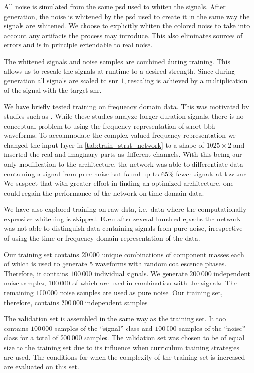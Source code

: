 All noise is simulated from the same \acrshort{psd} used to whiten the signals. After generation, the noise is whitened by the \acrshort{psd} used to create it in the same way the signals are whitened. We choose to explicitly whiten the colored noise to take into account any artifacts the process may introduce. This also eliminates sources of errors and is in principle extendable to real noise.

The whitened signals and noise samples are combined during training. This allows us to rescale the signals at runtime to a desired strength. Since during generation all signals are scaled to \acrshort{snr} $1$, rescaling is achieved by a multiplication of the signal with the target \acrshort{snr}.

We have briefly tested training on frequency domain data. This was motivated by studies such as \cite{Dreissigacker:2019edy, Wei:2020sfz}. While these studies analyze longer duration signals, there is no conceptual problem to using the frequency representation of short \acrshort{bbh} waveforms. To accommodate the complex valued frequency representation we changed the input layer in \autoref{tab:train_strat_network} to a shape of $1025\times 2$ and inserted the real and imaginary parts as different channels. With this being our only modification to the architecture, the network was able to differentiate data containing a signal from pure noise but found up to $65\%$ fewer signals at low \acrshort{snr}. We suspect that with greater effort in finding an optimized architecture, one could regain the performance of the network on time domain data.

We have also explored training on raw data, i.e.\ data where the computationally expensive whitening is skipped. Even after several hundred epochs the network was not able to distinguish data containing signals from pure noise, irrespective of using the time or frequency domain representation of the data.

Our training set contains $20\,000$ unique combinations of component masses each of which is used to generate 5 waveforms with random coalescence phases. Therefore, it contains $100\,000$ individual signals. We generate $200\,000$ independent noise samples, $100\,000$ of which are used in combination with the signals. The remaining $100\,000$ noise samples are used as pure noise. Our training set, therefore, contains $200\,000$ independent samples.

The validation set is assembled in the same way as the training set. It too contains $100\,000$ samples of the ``signal''-class and $100\,000$ samples of the ``noise''-class for a total of $200\,000$ samples. The validation set was chosen to be of equal size to the training set due to its influence when curriculum training strategies are used. The conditions for when the complexity of the training set is increased are evaluated on this set.

